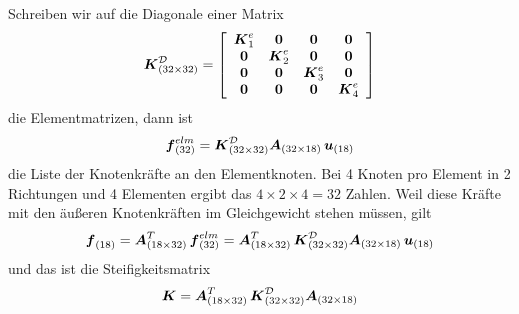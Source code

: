 Schreiben wir auf die Diagonale einer Matrix
\begin{align}\label{Eq24}
\vek K_{(32 \times 32)}^{\mathcal{D}} = \left[ \barr {c c c c} \vek K_1^e & \vek 0 & \vek 0 & \vek 0 \\
\vek  0 &\vek K_2^e & \vek 0 & \vek 0 \\
\vek 0 & \vek 0 & \vek K_3^e & \vek 0 \\
\vek 0 & \vek 0 & \vek 0 & \vek K_4^e \\
\earr \right]
\end{align}
die Elementmatrizen, dann ist
\begin{align}
\vek f^{elm}_{(32)} = \vek K^{\mathcal{D}}_{(32 \times 32)}\vek A_{(32 \times 18)}\,\vek u_{(18)}
\end{align}
die Liste  der Knotenkr\"{a}fte an den Elementknoten. Bei 4 Knoten pro Element in 2 Richtungen und 4 Elementen ergibt das $4 \times 2 \times 4 = 32$ Zahlen. Weil diese Kr\"{a}fte mit den \"{a}u{\ss}eren Knotenkr\"{a}ften im Gleichgewicht stehen m\"{u}ssen, gilt
\begin{align}
\vek f_{(18)} = \vek A_{(18 \times 32)}^T\,\vek f^{elm}_{(32)} = \vek A_{(18 \times 32)}^T\,\vek K^{\mathcal{D}}_{(32 \times 32)}\vek A_{(32 \times 18)}\,\vek u_{(18)}
\end{align}
und das ist die Steifigkeitsmatrix
\begin{align}\label{K_G}
\vek K = \vek A_{(18 \times 32)}^T\,\vek K^{\mathcal{D}}_{(32 \times 32)} \vek A_{(32 \times  18)}
\end{align}
